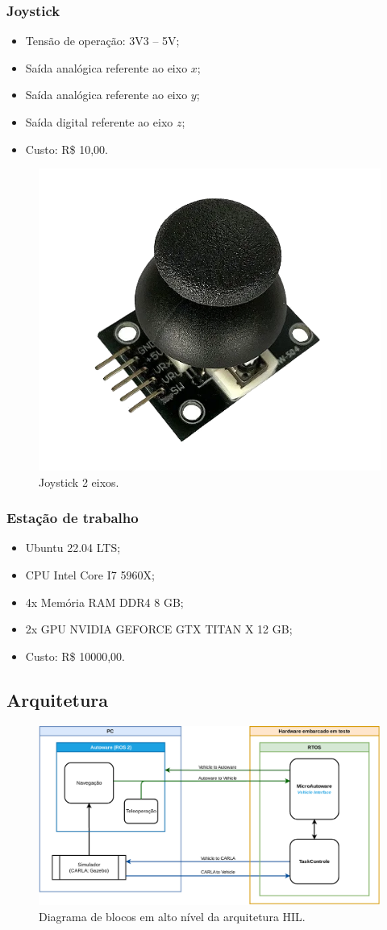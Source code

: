 \subsubsection*{Joystick}
	
	\begin{itemize}
		\item Tensão de operação: 3V3 -- 5V;
		\item Saída analógica referente ao eixo $x$;
		\item Saída analógica referente ao eixo $y$;
		\item Saída digital referente ao eixo $z$;
		\item Custo: R\$ 10,00.
	\end{itemize}



\begin{figure}[!h]
\centering
\includegraphics[width=0.3\linewidth]{img/joystick}
\caption{Joystick 2 eixos.}
\label{fig:joystick}
\end{figure}

\subsubsection*{Estação de trabalho}

\begin{itemize}
	\item Ubuntu 22.04 LTS;
	\item CPU Intel Core I7 5960X;
	\item 4x Memória RAM DDR4 8 GB;
	\item 2x GPU NVIDIA GEFORCE GTX TITAN X 12 GB;
	\item Custo: R\$ 10000,00.
\end{itemize}

\subsection{Arquitetura}

\begin{figure}[H]
	\centering
	\includegraphics[width=0.75\linewidth]{img/highLevelblock_diagram.pdf}
	\caption{Diagrama de blocos em alto nível da arquitetura HIL.}
	\label{fig:highLevelblock_diagram}
\end{figure}

